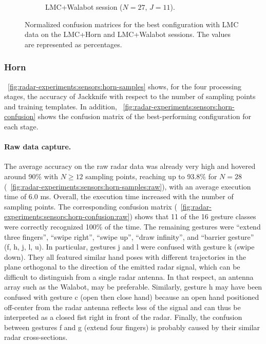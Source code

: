 \begin{figure}[t]
\begin{subfigure}{.49\textwidth}
        \vspace{-16pt}
        \captionsetup{width=.99\linewidth}
        \caption{LMC+Walabot session ($N{=}27$, $J{=}11$).}
        \label{fig:radar-experiments:sensors:lmc-confusion:walabot}
    \end{subfigure}
    \caption{Normalized confusion matrices for the best configuration with LMC data on the LMC+Horn and LMC+Walabot sessions. The values are represented as percentages.}
    \label{fig:radar-experiments:sensors:lmc-confusion}
\end{figure}


\subsubsection{Horn} \label{sec:radar-experiments:sensors:results:horn}
\fig~\ref{fig:radar-experiments:sensors:horn-samples} shows, for the four processing stages, the accuracy of Jackknife with respect to the number of sampling points and training templates. In addition, \fig~\ref{fig:radar-experiments:sensors:horn-confusion} shows the confusion matrix of the best-performing configuration for each stage.


\paragraph{Raw data capture.}
The average accuracy on the raw radar data was already very high and hovered around 90\% with $N{\ge}12$ sampling points, reaching up to 93.8\% for $N{=}28$ (\fig~\ref{fig:radar-experiments:sensors:horn-samples:raw}), with an average execution time of 6.0 ms. Overall, the execution time increased with the number of sampling points. 
%
The corresponding confusion matrix (\fig~\ref{fig:radar-experiments:sensors:horn-confusion:raw}) shows that 11 of the 16 gesture classes were correctly recognized 100\% of the time. The remaining gestures were ``extend three fingers'', ``swipe right'', ``swipe up'', ``draw infinity'', and ``barrier gesture'' (f, h, j, l, u). 
%
In particular, gestures j and l were confused with gesture k (swipe down). They all featured similar hand poses with different trajectories in the plane orthogonal to the direction of the emitted radar signal, which can be difficult to distinguish from a single radar antenna. In that respect, an antenna array such as the Walabot, may be preferable.
%
Similarly, gesture h may have been confused with gesture c (open then close hand) because an open hand positioned off-center from the radar antenna reflects less of the signal and can thus be interpreted as a closed fist right in front of the radar.
%
Finally, the confusion between gestures f and g (extend four fingers) is probably caused by their similar radar cross-sections.

